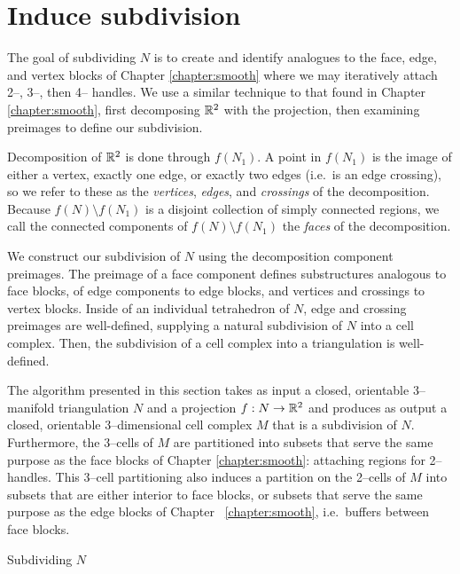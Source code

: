 \section{Induce subdivision}

The goal of subdividing $N$ is to create and identify analogues to the face, edge, and vertex blocks of Chapter \ref{chapter:smooth} where we may iteratively attach 2--, 3--, then 4-- handles.
We use a similar technique to that found in Chapter \ref{chapter:smooth}, first decomposing $\mathbb{R}^2$ with the projection, then examining preimages to define our subdivision.

Decomposition of $\mathbb{R}^2$ is done through $f(N_1)$.
A point in $f(N_1)$ is the image of either a vertex, exactly one edge, or exactly two edges (i.e.\ is an edge crossing), so we refer to these as the \emph{vertices}, \emph{edges}, and \emph{crossings} of the decomposition.
Because $f(N)\setminus f(N_1)$  is a disjoint collection of simply connected regions, we call the connected components of $f(N)\setminus f(N_1)$ the \emph{faces} of the decomposition.

We construct our subdivision of $N$ using the decomposition component preimages.
The preimage of a face component defines substructures analogous to face blocks, of edge components to edge blocks, and vertices and crossings to vertex blocks.
Inside of an individual tetrahedron of $N$, edge and crossing preimages are well-defined, supplying a natural subdivision of $N$ into a cell complex.
Then, the subdivision of a cell complex into a triangulation is well-defined.

The algorithm presented in this section takes as input a closed, orientable 3--manifold triangulation $N$ and a projection $f:N\to\mathbb{R}^2$ and produces as output a closed, orientable 3--dimensional cell complex $M$ that is a subdivision of $N$.
Furthermore, the 3--cells of $M$ are partitioned into subsets that serve the same purpose as the face blocks of Chapter \ref{chapter:smooth}: attaching regions for 2--handles.
This 3--cell partitioning also induces a partition on the 2--cells of $M$ into subsets that are either interior to face blocks, or subsets that serve the same purpose as the edge blocks of Chapter ~\ref{chapter:smooth}, i.e.\ buffers between face blocks.

\begin{algorithm}
	\caption{Subdividing $N$}
	\label{alg:subdividing-manifold}
\end{algorithm}
